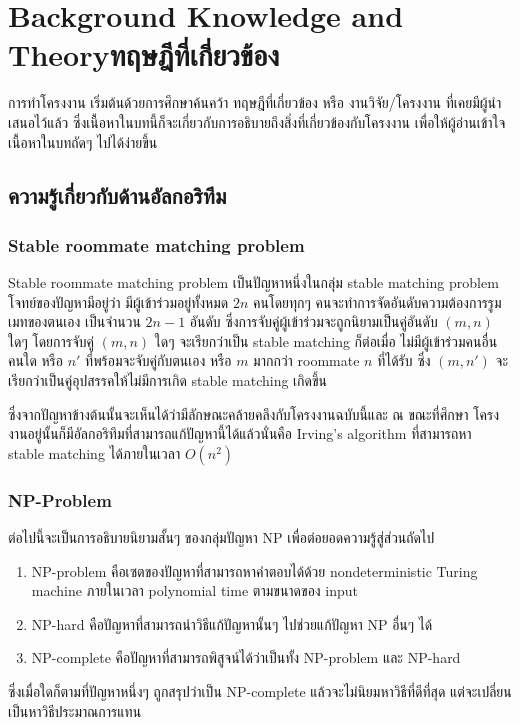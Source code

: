 \chapter{\ifenglish Background Knowledge and Theory\else ทฤษฎีที่เกี่ยวข้อง\fi}

การทำโครงงาน เริ่มต้นด้วยการศึกษาค้นคว้า ทฤษฎีที่เกี่ยวข้อง หรือ งานวิจัย/โครงงาน 
ที่เคยมีผู้นำเสนอไว้แล้ว ซึ่งเนื้อหาในบทนี้ก็จะเกี่ยวกับการอธิบายถึงสิ่งที่เกี่ยวข้องกับโครงงาน 
เพื่อให้ผู้อ่านเข้าใจเนื้อหาในบทถัดๆ ไปได้ง่ายขึ้น

\section{ความรู้เกี่ยวกับด้านอัลกอริทึม}
\subsection{Stable roommate matching problem}
Stable roommate matching problem เป็นปัญหาหนึ่งในกลุ่ม stable matching problem
โจทย์ของปัญหามีอยู่ว่า มีผู้เข้าร่วมอยู่ทั้งหมด $2n$ คนโดยทุกๆ คนจะทำการจัดอันดับความต้องการรูมเมทของตนเอง
เป็นจำนวน $2n-1$ อันดับ ซึ่งการจับคู่ผู้เข้าร่วมจะถูกนิยามเป็นคู่อันดับ $(m,n)$ ใดๆ โดยการจับคู่ $(m,n)$ ใดๆ จะเรียกว่าเป็น
stable matching ก็ต่อเมื่อ ไม่มีผู้เข้าร่วมคนอื่นคนใด หรือ $n'$ ที่พร้อมจะจับคู่กับตนเอง หรือ $m$ มากกว่า roommate $n$ ที่ได้รับ ซึ่ง $(m, n')$
จะเรียกว่าเป็นคู่อุปสรรคให้ไม่มีการเกิด stable matching เกิดขึ้น

ซึ่งจากปัญหาข้างต้นนั้นจะเห็นได้ว่ามีลักษณะคล้ายคลึงกับโครงงานฉบับนี้และ ณ ขณะที่ศึกษา
โครงงานอยู่นั้นก็มีอัลกอริทึมที่สามารถแก้ปัญหานี้ได้แล้วนั่นคือ Irving's algorithm ที่สามารถหา 
stable matching ได้ภายในเวลา $O(n^2)$

\subsection{NP-Problem}
ต่อไปนี้จะเป็นการอธิบายนิยามสั้นๆ ของกลุ่มปัญหา NP เพื่อต่อยอดความรู้สู่ส่วนถัดไป
\begin{enumerate}
  \item NP-problem คือเซตของปัญหาที่สามารถหาคำตอบได้ด้วย nondeterministic 
    Turing machine ภายในเวลา polynomial time ตามขนาดของ input
  \item  NP-hard คือปัญหาที่สามารถนำวิธีแก้ปัญหานั้นๆ ไปช่วยแก้ปัญหา NP อื่นๆ ได้
  \item  NP-complete คือปัญหาที่สามารถพิสูจน์ได้ว่าเป็นทั้ง NP-problem และ NP-hard
\end{enumerate}
ซึ่งเมื่อใดก็ตามที่ปัญหาหนึ่งๆ ถูกสรุปว่าเป็น NP-complete แล้วจะไม่นิยมหาวิธีที่ดีที่สุด
แต่จะเปลี่ยนเป็นหาวิธีประมาณการแทน

